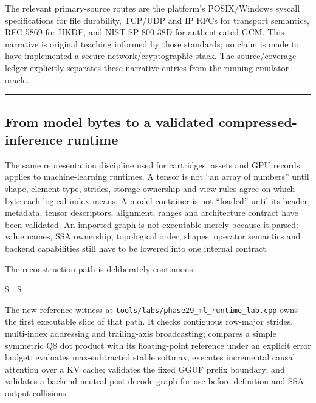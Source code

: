 The relevant primary-source routes are the platform's POSIX/Windows syscall specifications for file durability, TCP/UDP and IP RFCs for transport semantics, RFC 5869 for HKDF, and NIST SP 800-38D for authenticated GCM. This narrative is original teaching informed by those standards; no claim is made to have implemented a secure network/cryptographic stack. The source/coverage ledger explicitly separates these narrative entries from the running emulator oracle.

\begin{center}\rule{0.5\linewidth}{0.5pt}\end{center}

\subsection{From model bytes to a validated compressed-inference runtime}\label{from-model-bytes-to-a-validated-compressed-inference-runtime}

The same representation discipline used for cartridges, assets and GPU records applies to machine-learning runtimes. A tensor is not ``an array of numbers'' until shape, element type, strides, storage ownership and view rules agree on which byte each logical index means. A model container is not ``loaded'' until its header, metadata, tensor descriptors, alignment, ranges and architecture contract have been validated. An imported graph is not executable merely because it parsed: value names, SSA ownership, topological order, shapes, operator semantics and backend capabilities still have to be lowered into one internal contract.

The reconstruction path is deliberately continuous:

\$  \rightarrow {} \rightarrow {} \rightarrow {} \rightarrow {} \rightarrow {} \rightarrow {}. \$

The new reference witness at \texttt{tools/labs/phase29\_ml\_runtime\_lab.cpp} owns the first executable slice of that path. It checks contiguous row-major strides, multi-index addressing and trailing-axis broadcasting; compares a simple symmetric Q8 dot product with its floating-point reference under an explicit error budget; evaluates max-subtracted stable softmax; executes incremental causal attention over a KV cache; validates the fixed GGUF prefix boundary; and validates a backend-neutral post-decode graph for use-before-definition and SSA output collisions.


